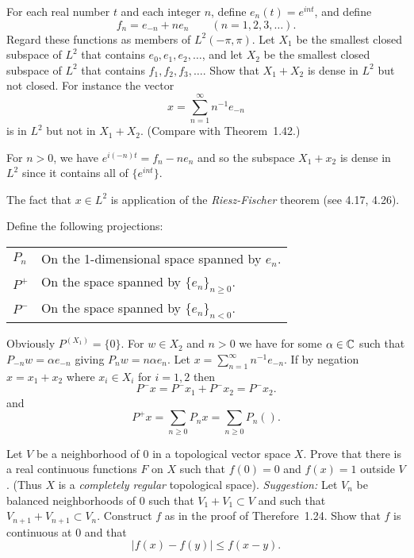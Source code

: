 \begin{enumerate}
\begin{excopy}
For each real number $t$ and each integer $n$, define \(e_n(t) = e^{int}\),
and define 
\begin{equation*}
  f_n = e_{-n} + ne_n \qquad (n=1,2,3,\ldots).
\end{equation*}
Regard these functions as members of \(L^2(-\pi,\pi)\).
Let \(X_1\) be the smallest closed subspace of \(L^2\) that contains 
\(e_0,e_1,e_2,\ldots\), and let \(X_2\) be the smallest closed subspace
of \(L^2\) that contains \(f_1,f_2,f_3,\ldots\). Show that \(X_1+X_2\)
is dense in \(L^2\) but not closed.
For instance the vector
\begin{equation*}
 x = \sum_{n=1}^\infty n^{-1}e_{-n}
\end{equation*}
is in \(L^2\) but not in \(X_1+X_2\). (Compare with Theorem~1.42.)
\end{excopy}

For \(n>0\), we have \(e^{i(-n)t} = f_n - n e_n\) and so
the subspace \(X_1+x_2\) is dense in \(L^2\) since it contains 
all of \(\{e^{int}\}\).

The fact that \(x\in L^2\) is application of the 
\emph{Riesz-Fischer} theorem (see \cite{RudinRCA80} 4.17, 4.26).

Define the following projections:\newline
\begin{tabular}{lp{}}
 \(P_n\) & On the 1-dimensional space spanned by \(e_n\).\\
 \(P^+\) & On the space spanned by \(\{e_n\}_{n\geq 0}\).\\
 \(P^-\) & On the space spanned by \(\{e_n\}_{n < 0}\).\\
\end{tabular}

Obviously \(P^(X_1) = \{0\}\).
For \(w\in X_2\) and \(n>0\) we have 
for some \(\alpha \in \mathbb{C}\) such that
\(P_{-n}w = \alpha e_{-n}\) giving \(P_n w = n\alpha e_n\).
Let \(x = \sum_{n=1}^\infty n^{-1}e_{-n}\). If by negation
\(x = x_1 + x_2\) where \(x_i\in X_i\) for \(i=1,2\)  then
\begin{equation*}
P^- x = P^- x_1 + P^- x_2 = P^- x_2.
\end{equation*}
and
\begin{equation*}
P^+ x = \sum_{n\geq 0} P_n x = \sum_{n\geq 0} P_n \left(\right).
\end{equation*}


\begin{excopy}
Let $V$ be a neighborhood of $0$ in a topological vector space $X$.
Prove that there is a real continuous functions $F$ on $X$ such that
\(f(0) = 0\) and \(f(x)=1\) outside $V$.
(Thus $X$ is a 
\emph{completely regular} topological space).
\emph{Suggestion:} Let \(V_n\) be balanced neighborhoods of $0$ 
such that \(V_1+V_1 \subset V\) and
such that \(V_{n+1}+V_{n+1} \subset V_n\).
Construct $f$ as in the proof of Therefore~1.24.
Show that $f$ is continuous at $0$ and that
\begin{equation*}
 |f(x) - f(y)| \leq f(x-y).
\end{equation*}


\end{excopy}
\end{enumerate}
